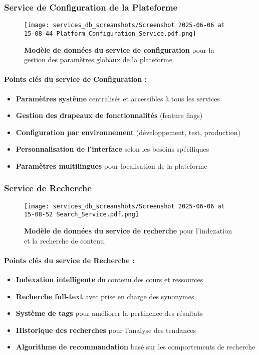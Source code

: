 \subsubsection{Service de Configuration de la Plateforme}
\begin{figure}[h!]
  \centering
  \texttt{[image: services\_db\_screanshots/Screenshot 2025-06-06 at 15-08-44 Platform\_Configuration\_Service.pdf.png]}
  \caption{\textbf{Modèle de données du service de configuration} pour la gestion des paramètres globaux de la plateforme.}
  \label{fig:platform_config_service}
\end{figure}
\vspace{-10pt}
\small
\paragraph{Points clés du service de Configuration :}
\begin{itemize}[leftmargin=*,noitemsep,topsep=0pt]
  \item \textbf{Paramètres système} centralisés et accessibles à tous les services
  \item \textbf{Gestion des drapeaux de fonctionnalités} (feature flags)
  \item \textbf{Configuration par environnement} (développement, test, production)
  \item \textbf{Personnalisation de l'interface} selon les besoins spécifiques
  \item \textbf{Paramètres multilingues} pour localisation de la plateforme
\end{itemize}
\normalsize
\newpage

\subsubsection{Service de Recherche}
\begin{figure}[h!]
  \centering
  \texttt{[image: services\_db\_screanshots/Screenshot 2025-06-06 at 15-08-52 Search\_Service.pdf.png]}
  \caption{\textbf{Modèle de données du service de recherche} pour l'indexation et la recherche de contenu.}
  \label{fig:search_service}
\end{figure}
\vspace{-10pt}
\small
\paragraph{Points clés du service de Recherche :}
\begin{itemize}[leftmargin=*,noitemsep,topsep=0pt]
  \item \textbf{Indexation intelligente} du contenu des cours et ressources
  \item \textbf{Recherche full-text} avec prise en charge des synonymes
  \item \textbf{Système de tags} pour améliorer la pertinence des résultats
  \item \textbf{Historique des recherches} pour l'analyse des tendances
  \item \textbf{Algorithme de recommandation} basé sur les comportements de recherche
\end{itemize}

